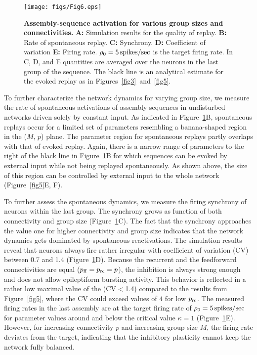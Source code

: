     \begin{figure}[!h]
      \texttt{[image: figs/Fig6.eps]}
      \caption{{\bf Assembly-sequence activation for various group sizes and
        connectivities.}
        \textbf{A:} Simulation results for the quality of replay.
        \textbf{B:} Rate of spontaneous replay.
        \textbf{C:} Synchrony.
        \textbf{D:} Coefficient of variation 
        \textbf{E:} Firing rate. $\rho_0=5 \,\rm spikes/sec$ is the target firing
        rate. In C, D, and E quantities are averaged over the neurons in the last
        group of the sequence. The black line is an analytical estimate for the
        evoked replay as in Figures~\ref{fig3}~and~\ref{fig5}.
      }
      \label{fig6}
    \end{figure}
    
    To further characterize the network dynamics for varying group size, we
    measure the rate of spontaneous activations of assembly sequences in
    undisturbed networks driven solely by constant input. As indicated in
    Figure~\ref{fig6}B, spontaneous replays occur for a limited set of parameters
    resembling a banana-shaped region in the ($M$, $p$) plane. The parameter
    region for spontaneous replays partly overlaps with that of evoked replay.
    Again, there is a narrow range of parameters to the right of the black line
    in Figure~\ref{fig6}B for which sequences can be evoked by external input
    while not being replayed spontaneously. As shown above, the size of this
    region can be controlled by external input to the whole network
    (Figure~\ref{fig5}E, F).

    To further assess the spontaneous dynamics, we measure the firing synchrony
    of neurons within the last group. The synchrony grows as function of both
    connectivity and group size (Figure~\ref{fig6}C). The fact that the synchrony
    approaches the value one for higher connectivity and group size indicates
    that the network dynamics gets dominated by spontaneous reactivations. The
    simulation results reveal that neurons always fire rather irregular with
    coefficient of variation (CV) between 0.7 and 1.4 (Figure~\ref{fig6}D).
    Because the recurrent and the feedforward connectivities are equal ($p_{\rm
    ff} = p_{\rm rc} = p$), the inhibition is always strong enough and does not
    allow epileptiform bursting activity. This behavior is reflected in a
    rather low maximal value of the (CV$<$1.4) compared to the results from
    Figure~\ref{fig5}, where the CV could exceed values of $4$ for low $p_{\rm
    rc}$. The measured firing rates in the last assembly are at the target
    firing rate of $\rho_0=5 \, \rm spikes/sec$ for parameter values around and
    below the critical value $\kappa=1$ (Figure~\ref{fig6}E). However, for
    increasing connectivity $p$ and increasing group size $M$, the firing rate
    deviates from the target, indicating that the inhibitory plasticity cannot
    keep the network fully balanced.

